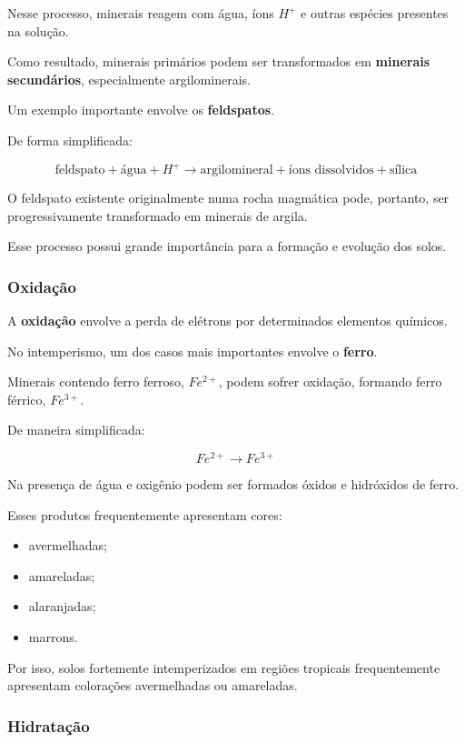 \documentclass[a4paper,12pt]{article}
\theoremstyle{definition}
\theoremstyle{definition}
\theoremstyle{definition}
\begin{document}
Nesse processo, minerais reagem com água, íons \(H^+\) e outras espécies presentes na solução.

Como resultado, minerais primários podem ser transformados em \textbf{minerais secundários}, especialmente argilominerais.

Um exemplo importante envolve os \textbf{feldspatos}.

De forma simplificada:

\[
\text{feldspato}
+
\text{água}
+
H^+
\rightarrow
\text{argilomineral}
+
\text{íons dissolvidos}
+
\text{sílica}
\]

O feldspato existente originalmente numa rocha magmática pode, portanto, ser progressivamente transformado em minerais de argila.

Esse processo possui grande importância para a formação e evolução dos solos.

\subsubsection{Oxidação}

A \textbf{oxidação} envolve a perda de elétrons por determinados elementos químicos.

No intemperismo, um dos casos mais importantes envolve o \textbf{ferro}.

Minerais contendo ferro ferroso, \(Fe^{2+}\), podem sofrer oxidação, formando ferro férrico, \(Fe^{3+}\).

De maneira simplificada:

\[
Fe^{2+}
\rightarrow
Fe^{3+}
\]

Na presença de água e oxigênio podem ser formados óxidos e hidróxidos de ferro.

Esses produtos frequentemente apresentam cores:

\begin{itemize}
    \item avermelhadas;
    \item amareladas;
    \item alaranjadas;
    \item marrons.
\end{itemize}

Por isso, solos fortemente intemperizados em regiões tropicais frequentemente apresentam colorações avermelhadas ou amareladas.

\subsubsection{Hidratação}
\end{document}
